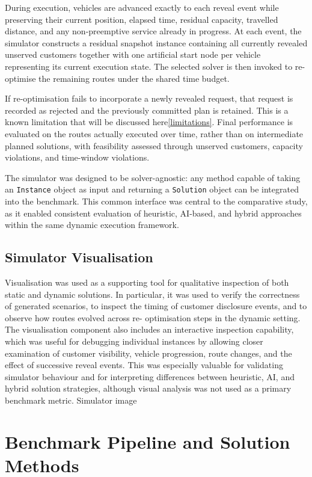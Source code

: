 During execution, vehicles are advanced exactly to each reveal event while
preserving their current position, elapsed time, residual capacity, travelled
distance, and any non-preemptive service already in progress. At each event, the
simulator constructs a residual snapshot instance containing all currently
revealed unserved customers together with one artificial start node per vehicle
representing its current execution state. The selected solver is then invoked to
re-optimise the remaining routes under the shared time budget.

If re-optimisation fails to incorporate a newly revealed request, that request
is recorded as rejected and the previously committed plan is retained. This is a
known limitation that will be discussed here\ref{limitations}. Final performance
is evaluated on the routes actually executed over time, rather than on
intermediate planned solutions, with feasibility assessed through unserved
customers, capacity violations, and time-window violations.

The simulator was designed to be solver-agnostic: any method capable of taking
an
\texttt{Instance}
object as input and returning a
\texttt{Solution}
object can be integrated into the benchmark. This common interface was central
to the comparative study, as it enabled consistent evaluation of heuristic,
AI-based, and hybrid approaches within the same dynamic execution framework.
\subsection{Simulator Visualisation}
Visualisation was used as a supporting tool for qualitative inspection of both
static and dynamic solutions. In particular, it was used to verify the
correctness of generated scenarios, to inspect the timing of customer disclosure
events, and to observe how routes evolved across re- optimisation steps in the
dynamic setting. The visualisation component also includes an interactive
inspection capability, which was useful for debugging individual instances by
allowing closer examination of customer visibility, vehicle progression, route
changes, and the effect of successive reveal events. This was especially
valuable for validating simulator behaviour and for interpreting differences
between heuristic, AI, and hybrid solution strategies, although visual analysis
was not used as a primary benchmark metric. {\color{red}Simulator image}



\section{Benchmark Pipeline and Solution Methods}

